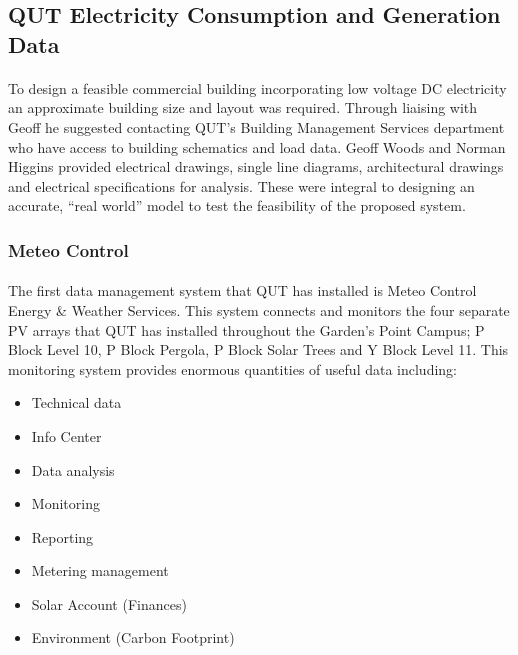 
\subsection{QUT Electricity Consumption and Generation Data} \label{section:QUT-Data}

\paragraph{}
To design a feasible commercial building incorporating low voltage DC electricity an approximate building size and layout was required. Through liaising with Geoff he suggested contacting QUT's Building Management Services department who have access to building schematics and load data. Geoff Woods and Norman Higgins provided electrical drawings, single line diagrams, architectural drawings and electrical specifications for analysis. These were integral to designing an accurate, ``real world'' model to test the feasibility of the proposed system.

\subsubsection{Meteo Control}

\paragraph{}
The first data management system that QUT has installed is Meteo Control Energy \& Weather Services. This system connects and monitors the four separate PV arrays that QUT has installed throughout the Garden's Point Campus; P Block Level 10, P Block Pergola, P Block Solar Trees and Y Block Level 11. This monitoring system provides enormous quantities of useful data including: 

\begin{itemize}[noitemsep,nolistsep]
	\item Technical data 
	\item Info Center
	\item Data analysis
	\item Monitoring
	\item Reporting
	\item Metering management
	\item Solar Account (Finances)
	\item Environment (Carbon Footprint)
\end{itemize} 


